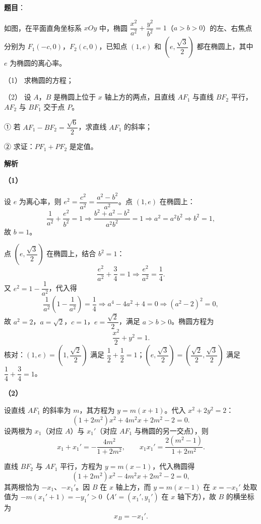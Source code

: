 \begin{answer}

\textbf{题目}：

如图，在平面直角坐标系 $xOy$ 中，椭圆 $\dfrac{x^2}{a^2}+\dfrac{y^2}{b^2}=1$（$a>b>0$）的左、右焦点分别为 $F_1(-c,0)$，$F_2(c,0)$，已知点 $(1,e)$ 和 $\left(e,\dfrac{\sqrt3}{2}\right)$ 都在椭圆上，其中 $e$ 为椭圆的离心率。

（1） 求椭圆的方程；

（2） 设 $A$，$B$ 是椭圆上位于 $x$ 轴上方的两点，且直线 $AF_1$ 与直线 $BF_2$ 平行，$AF_2$ 与 $BF_1$ 交于点 $P$。

① 若 $AF_1-BF_2=\dfrac{\sqrt6}{2}$，求直线 $AF_1$ 的斜率；

② 求证：$PF_1+PF_2$ 是定值。
\nopagebreak[4]
\begin{center}\end{center}
\nopagebreak[4]
\textbf{解析}

\textbf{（1）}

设 $e$ 为离心率，则 $e^2=\dfrac{c^2}{a^2}=\dfrac{a^2-b^2}{a^2}$。点 $(1,e)$ 在椭圆上：
\nopagebreak[4]
\[\frac{1}{a^2}+\frac{e^2}{b^2}=1\Longrightarrow\frac{b^2+a^2-b^2}{a^2b^2}=1\Longrightarrow a^2=a^2b^2\Longrightarrow b^2=1,\]
故 $b=1$。

点 $\left(e,\dfrac{\sqrt3}{2}\right)$ 在椭圆上，结合 $b^2=1$：
\nopagebreak[4]
\[\frac{e^2}{a^2}+\frac34=1\Longrightarrow\frac{e^2}{a^2}=\frac14.\]
又 $e^2=1-\dfrac{1}{a^2}$，代入得
\nopagebreak[4]
\[\frac{1}{a^2}\left(1-\frac1{a^2}\right)=\frac14\Longrightarrow a^4-4a^2+4=0\Longrightarrow\left(a^2-2\right)^2=0,\]
故 $a^2=2$，$a=\sqrt2$，$c=1$，$e=\dfrac{\sqrt2}{2}$，满足 $a>b>0$。椭圆方程为
\nopagebreak[4]
\[\frac{x^2}{2}+y^2=1.\]
核对：$(1,e)=\left(1,\dfrac{\sqrt2}{2}\right)$ 满足 $\dfrac12+\dfrac12=1$；$\left(e,\dfrac{\sqrt3}{2}\right)=\left(\dfrac{\sqrt2}{2},\dfrac{\sqrt3}{2}\right)$ 满足 $\dfrac14+\dfrac34=1$。

\textbf{（2）}

设直线 $AF_1$ 的斜率为 $m$，其方程为 $y=m(x+1)$。代入 $x^2+2y^2=2$：
\nopagebreak[4]
\[(1+2m^2)x^2+4m^2x+2m^2-2=0.\]
设两根为 $x_1$（对应 $A$）与 $x_1'$（对应 $AF_1$ 与椭圆的另一交点），则
\nopagebreak[4]
\[x_1+x_1'=-\frac{4m^2}{1+2m^2},\qquad x_1x_1'=\frac{2(m^2-1)}{1+2m^2}. \tag{3}\]

直线 $BF_2$ 与 $AF_1$ 平行，方程为 $y=m(x-1)$，代入椭圆得
\nopagebreak[4]
\[(1+2m^2)x^2-4m^2x+2m^2-2=0,\]
其两根恰为 $-x_1$、$-x_1'$。因 $B$ 在 $x$ 轴上方，而 $y=m(x-1)$ 在 $x=-x_1'$ 处取值为 $-m(x_1'+1)=-y_1'>0$（$A'=(x_1',y_1')$ 在 $x$ 轴下方），故 $B$ 的横坐标为
\nopagebreak[4]
\[x_B=-x_1'.\]


\end{answer}
